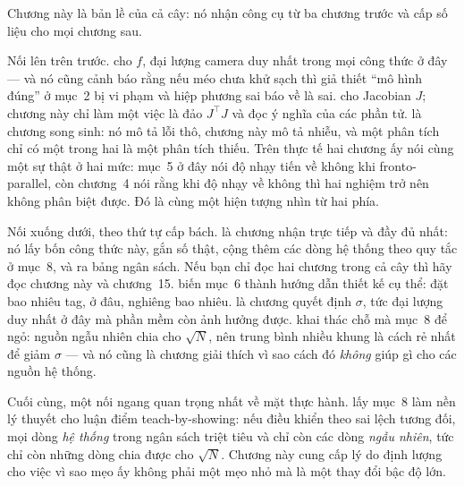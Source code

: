 \documentclass[../../marker.tex]{subfiles}
\begin{document}
Chương này là bản lề của cả cây: nó nhận công cụ từ ba chương trước và cấp số liệu cho mọi chương sau.

Nối lên trên trước.  cho \(f\), đại lượng camera duy nhất trong mọi công thức ở đây --- và nó cũng cảnh báo rằng nếu méo chưa khử sạch thì giả thiết ``mô hình đúng'' ở mục~2 bị vi phạm và hiệp phương sai báo về là sai.  cho Jacobian \(J\); chương này chỉ làm một việc là đảo \(J^{\top}J\) và đọc ý nghĩa của các phần tử.  là chương song sinh: nó mô tả lỗi thô, chương này mô tả nhiễu, và một phân tích chỉ có một trong hai là một phân tích thiếu. Trên thực tế hai chương ấy nói cùng một sự thật ở hai mức: mục~5 ở đây nói độ nhạy tiến về không khi fronto-parallel, còn chương~4 nói rằng khi độ nhạy về không thì hai nghiệm trở nên không phân biệt được. Đó là cùng một hiện tượng nhìn từ hai phía.

Nối xuống dưới, theo thứ tự cấp bách.  là chương nhận trực tiếp và đầy đủ nhất: nó lấy bốn công thức này, gắn số thật, cộng thêm các dòng hệ thống theo quy tắc ở mục~8, và ra bảng ngân sách. Nếu bạn chỉ đọc hai chương trong cả cây thì hãy đọc chương này và chương~15.  biến mục~6 thành hướng dẫn thiết kế cụ thể: đặt bao nhiêu tag, ở đâu, nghiêng bao nhiêu.  là chương quyết định \(\sigma\), tức đại lượng duy nhất ở đây mà phần mềm còn ảnh hưởng được.  khai thác chỗ mà mục~8 để ngỏ: nguồn ngẫu nhiên chia cho \(\sqrt{N}\), nên trung bình nhiều khung là cách rẻ nhất để giảm \(\sigma\) --- và nó cũng là chương giải thích vì sao cách đó \emph{không} giúp gì cho các nguồn hệ thống.

Cuối cùng, một nối ngang quan trọng nhất về mặt thực hành.  lấy mục~8 làm nền lý thuyết cho luận điểm teach-by-showing: nếu điều khiển theo sai lệch tương đối, mọi dòng \emph{hệ thống} trong ngân sách triệt tiêu và chỉ còn các dòng \emph{ngẫu nhiên}, tức chỉ còn những dòng chia được cho \(\sqrt{N}\). Chương này cung cấp lý do định lượng cho việc vì sao mẹo ấy không phải một mẹo nhỏ mà là một thay đổi bậc độ lớn.
\end{document}
